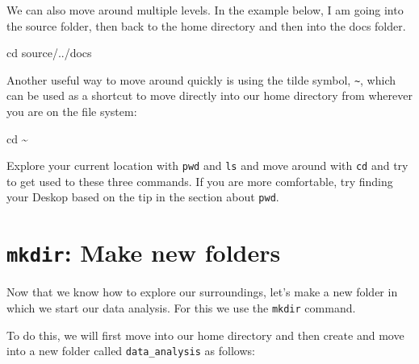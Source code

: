 \documentclass[
  letterpaper,
  DIV=11,
  numbers=noendperiod]{scrreprt}
\newenvironment{Shaded}{}{}
\newcommand{\BuiltInTok}[1]{\textcolor[rgb]{0.84,0.23,0.29}{#1}}
\newcommand{\NormalTok}[1]{\textcolor[rgb]{0.14,0.16,0.18}{#1}}
\begin{document}
We can also move around multiple levels. In the example below, I am
going into the source folder, then back to the home directory and then
into the docs folder.

\begin{Shaded}
\begin{Highlighting}[]
\BuiltInTok{cd}\NormalTok{ source/../docs}
\end{Highlighting}
\end{Shaded}

Another useful way to move around quickly is using the tilde symbol,
\texttt{\textasciitilde{}}, which can be used as a shortcut to move
directly into our home directory from wherever you are on the file
system:

\begin{Shaded}
\begin{Highlighting}[]
\BuiltInTok{cd}\NormalTok{ \textasciitilde{}}
\end{Highlighting}
\end{Shaded}

\begin{tcolorbox}[enhanced jigsaw, breakable, left=2mm, title=\textcolor{quarto-callout-caution-color}{\faFire}\hspace{0.5em}{Exercise}, opacityback=0, opacitybacktitle=0.6, rightrule=.15mm, bottomrule=.15mm, colback=white, colframe=quarto-callout-caution-color-frame, coltitle=black, bottomtitle=1mm, arc=.35mm, toprule=.15mm, colbacktitle=quarto-callout-caution-color!10!white, toptitle=1mm, titlerule=0mm, leftrule=.75mm]

Explore your current location with \texttt{pwd} and \texttt{ls} and move
around with \texttt{cd} and try to get used to these three commands. If
you are more comfortable, try finding your Deskop based on the tip in
the section about \texttt{pwd}.

\end{tcolorbox}

\section{\texorpdfstring{\texttt{mkdir}: Make new
folders}{mkdir: Make new folders}}\label{mkdir-make-new-folders}

Now that we know how to explore our surroundings, let's make a new
folder in which we start our data analysis. For this we use the
\texttt{mkdir} command.

To do this, we will first move into our home directory and then create
and move into a new folder called \texttt{data\_analysis} as follows:
\end{document}
